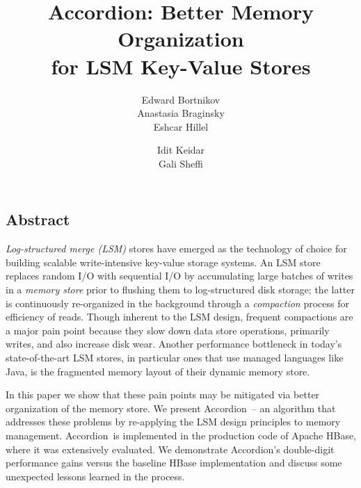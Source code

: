 \documentclass{vldb}
\newcommand{\sys}{Accordion}
\begin{document}
\date{}

\title{\sys: Better Memory Organization\\ for LSM Key-Value Stores}

\author{
\alignauthor
Edward Bortnikov\\
       \email{}
\alignauthor       
Anastasia Braginsky\\
       \email{}
\alignauthor
Eshcar Hillel\\
       \email{}
       \and
\alignauthor
Idit Keidar\\
       \email{}       
\alignauthor
Gali Sheffi\\
       \email{}
} %

\maketitle




\subsection*{Abstract}

\emph{
Log-structured merge (LSM)} stores have emerged as the technology of choice for building scalable 
write-intensive key-value storage systems. An LSM store replaces random I/O with sequential 
I/O by accumulating large batches of writes in a \emph{memory store} prior to flushing them to log-structured 
disk storage; the latter is continuously re-organized in the background through a \emph{compaction}
process for efficiency of reads. Though inherent to the LSM design, frequent compactions are a major pain point 
because they slow down data store operations, primarily writes, and also increase disk wear. 
Another performance bottleneck in today's state-of-the-art LSM stores, in particular ones that use
managed languages like Java,  is the 
fragmented memory layout of their dynamic memory store.

In this paper we show 
that these pain points may be mitigated via better  organization of the memory store.
We present \sys\ -- an algorithm that addresses these problems by re-applying
the LSM design principles to memory management. 
\sys\ is implemented in the production code of Apache HBase, where it 
was extensively evaluated.
We demonstrate \sys's double-digit performance gains versus 
the baseline HBase implementation and discuss some unexpected lessons learned in the process. 
\end{document}
